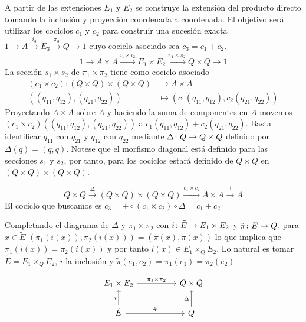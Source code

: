 \begin{proposicion}
	\begin{demostracion}
		A partir de las extensiones $E_1$ y $E_2$ se construye la extensión del producto directo tomando la inclusión y proyección coordenada a coordenada. El objetivo será utilizar los cociclos $c_1$ y $c_2$ para construir una sucesión exacta $1\xrightarrow{} A\xrightarrow{i_3} E_3\xrightarrow{\pi_3} Q \xrightarrow{} 1$ cuyo cociclo asociado sea $c_3=c_1+c_2$.
		\begin{equation}
			1\xrightarrow{} A\times A \xrightarrow{i_1\times i_2} E_1\times E_2\xrightarrow{\pi_1\times\pi_2} Q\times Q \xrightarrow{} 1 %
		\end{equation}
		La sección $s_1\times s_2$ de $\pi_1\times \pi_2$ tiene como cociclo asociado
		\begin{align}
			(c_1\times c_2)\colon (Q\times Q)\times (Q\times Q) &\to A\times A \\
			                              ((q_{11},q_{12}),(q_{21},q_{22})) &\mapsto (c_1(q_{11},q_{12}),c_2(q_{21},q_{22})) %
		\end{align}
		Proyectando $A\times A$ sobre $A$ y haciendo la suma de componentes en $A$ movemos $(c_1\times c_2)((q_{11},q_{12}),(q_{21},q_{22}))$ a $c_1(q_{11},q_{12}) + c_2(q_{21},q_{22})$. Basta identificar $q_{11}$ con $q_{21}$ y $q_{12}$ con $q_{22}$ mediante $\Delta\colon Q\to Q\times Q$ definido por $\Delta(q)=(q,q)$. Notese que el morfismo diagonal está definido para las secciones $s_1$ y $s_2$, por tanto, para los cociclos estará definido de $Q\times Q$ en $(Q\times Q)\times (Q\times Q)$.
		
		\begin{equation}
			Q\times Q \xrightarrow{\Delta} (Q\times Q)\times (Q\times Q) \xrightarrow{c_1\times c_2} A\times A\xrightarrow{+} A
		\end{equation}
		El cociclo que buscamos es $c_3=+\circ (c_1\times c_2)\circ \Delta=c_1+c_2$
		
		Completando el diagrama de $\Delta$ y $\pi_1 \times \pi_2$ con $i\colon \tilde E\to E_1\times E_2$ y $\tilde\pi\colon E\to Q$, para $x\in \tilde E$ $(\pi_1(i(x)),\pi_2(i(x)))=(\tilde\pi(x),\tilde\pi(x))$ lo que implica que $\pi_1(i(x))=\pi_2(i(x))$ y por tanto $i(x)\in E_1\times_Q E_2$. Lo natural es tomar $\tilde E = E_1\times_Q E_2$, $i$ la inclusión y $\tilde\pi(e_1,e_2)=\pi_1(e_1)=\pi_2(e_2)$.
		
		\[\begin{tikzcd}
			{E_1\times E_2} && {Q\times Q} \\
			{\tilde E} && Q
			\arrow["i", from=2-1, to=1-1]
			\arrow["{\pi_1\times \pi_2}", from=1-1, to=1-3]
			\arrow["\Delta", from=2-3, to=1-3]
			\arrow["{\tilde \pi}", from=2-1, to=2-3]
		\end{tikzcd}\]
		

\end{demostracion}
\end{proposicion}
